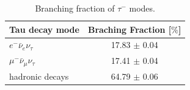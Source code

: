 


 \begin{table}[ht]
 \begin{center}
 \begin{tabular}{|l|c|}
   \hline
   Tau decay mode                                          &  Braching Fraction [$\%$]    \\ \hline\hline
   $e^{-}\bar{\nu}_{e}\nu_{\tau}$                          & 17.83 $\pm$ 0.04             \\ \hline
   $\mu^{-}\bar{\nu}_{\mu}\nu_{\tau}$                      & 17.41 $\pm$ 0.04             \\ \hline
   hadronic decays                                         & 64.79 $\pm$ 0.06            \\ \hline
   \hline
 \end{tabular}
 \end{center}
 \caption{Branching fraction of $\tau^{-}$ modes\cite{PDG}.}\label{tab:taumodes}
 \end{table}




